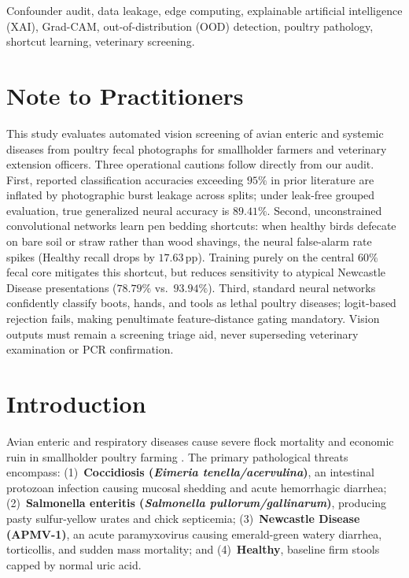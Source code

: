 \documentclass[conference]{IEEEtran}
\begin{document}
\begin{IEEEkeywords}
Confounder audit, data leakage, edge computing, explainable artificial intelligence (XAI), Grad-CAM, out-of-distribution (OOD) detection, poultry pathology, shortcut learning, veterinary screening.
\end{IEEEkeywords}

\section*{Note to Practitioners}
This study evaluates automated vision screening of avian enteric and systemic diseases from poultry fecal photographs for smallholder farmers and veterinary extension officers. Three operational cautions follow directly from our audit. First, reported classification accuracies exceeding $95\%$ in prior literature are inflated by photographic burst leakage across splits; under leak-free grouped evaluation, true generalized neural accuracy is $89.41\%$. Second, unconstrained convolutional networks learn pen bedding shortcuts: when healthy birds defecate on bare soil or straw rather than wood shavings, the neural false-alarm rate spikes (Healthy recall drops by $17.63$\,pp). Training purely on the central $60\%$ fecal core mitigates this shortcut, but reduces sensitivity to atypical Newcastle Disease presentations ($78.79\%$ vs.\ $93.94\%$). Third, standard neural networks confidently classify boots, hands, and tools as lethal poultry diseases; logit-based rejection fails, making penultimate feature-distance gating mandatory. Vision outputs must remain a screening triage aid, never superseding veterinary examination or PCR confirmation.

\section{Introduction}
Avian enteric and respiratory diseases cause severe flock mortality and economic ruin in smallholder poultry farming \cite{machuve2022poultry, fao2020poultry}. The primary pathological threats encompass: (1)~\textbf{Coccidiosis (\textit{Eimeria tenella/acervulina})}, an intestinal protozoan infection causing mucosal shedding and acute hemorrhagic diarrhea; (2)~\textbf{Salmonella enteritis (\textit{Salmonella pullorum/gallinarum})}, producing pasty sulfur-yellow urates and chick septicemia; (3)~\textbf{Newcastle Disease (APMV-1)}, an acute paramyxovirus causing emerald-green watery diarrhea, torticollis, and sudden mass mortality; and (4)~\textbf{Healthy}, baseline firm stools capped by normal uric acid.
\end{document}
